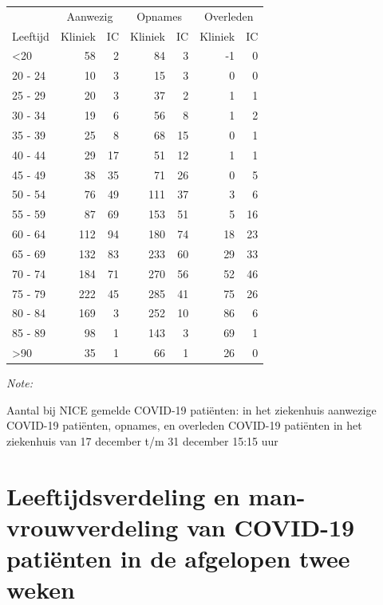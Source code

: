 \documentclass[
  english,
  man,floatsintext]{apa6}
\begin{document}
\begin{table}
\centering\begingroup\fontsize{10}{12}\selectfont

\begin{threeparttable}
\begin{tabular}{lrrrrrr}
\toprule
\multicolumn{1}{c}{ } & \multicolumn{2}{c}{Aanwezig} & \multicolumn{2}{c}{Opnames} & \multicolumn{2}{c}{Overleden} \\
\cmidrule(l{3pt}r{3pt}){2-3} \cmidrule(l{3pt}r{3pt}){4-5} \cmidrule(l{3pt}r{3pt}){6-7}
Leeftijd & Kliniek & IC & Kliniek & IC & Kliniek & IC\\
\midrule
<20 & 58 & 2 & 84 & 3 & -1 & 0\\
20 - 24 & 10 & 3 & 15 & 3 & 0 & 0\\
25 - 29 & 20 & 3 & 37 & 2 & 1 & 1\\
30 - 34 & 19 & 6 & 56 & 8 & 1 & 2\\
35 - 39 & 25 & 8 & 68 & 15 & 0 & 1\\
40 - 44 & 29 & 17 & 51 & 12 & 1 & 1\\
45 - 49 & 38 & 35 & 71 & 26 & 0 & 5\\
50 - 54 & 76 & 49 & 111 & 37 & 3 & 6\\
55 - 59 & 87 & 69 & 153 & 51 & 5 & 16\\
60 - 64 & 112 & 94 & 180 & 74 & 18 & 23\\
65 - 69 & 132 & 83 & 233 & 60 & 29 & 33\\
70 - 74 & 184 & 71 & 270 & 56 & 52 & 46\\
75 - 79 & 222 & 45 & 285 & 41 & 75 & 26\\
80 - 84 & 169 & 3 & 252 & 10 & 86 & 6\\
85 - 89 & 98 & 1 & 143 & 3 & 69 & 1\\
>90 & 35 & 1 & 66 & 1 & 26 & 0\\
\bottomrule
\end{tabular}
\begin{tablenotes}
\item \textit{Note: } 
\item Aantal bij NICE gemelde COVID-19 patiënten: in het ziekenhuis aanwezige COVID-19 patiënten, opnames, en overleden COVID-19 patiënten in het ziekenhuis van 17 december t/m 31 december 15:15 uur
\end{tablenotes}
\end{threeparttable}
\endgroup{}
\end{table}

\newpage

\hypertarget{leeftijdsverdeling-en-man-vrouwverdeling-van-covid-19-patiuxebnten-in-de-afgelopen-twee-weken}{%
\section{Leeftijdsverdeling en man-vrouwverdeling van COVID-19 patiënten in de afgelopen twee weken}\label{leeftijdsverdeling-en-man-vrouwverdeling-van-covid-19-patiuxebnten-in-de-afgelopen-twee-weken}}
\end{document}
